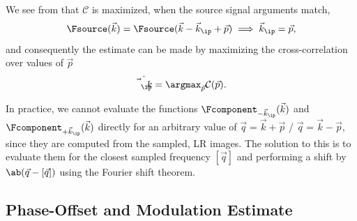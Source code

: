 We see from  that \(\mathcal{C}\) is maximized, when the source signal arguments match, 
    \begin{equation*}
        \Fsource(\vec{k}) = \Fsource(\vec{k} - \vec{k}_\ip + \vec{p}) \implies \vec{k}_\ip = \vec{p},
    \end{equation*}
    and consequently the estimate can be made by maximizing the cross-correlation over values of \(\vec{p}\)
    \begin{equation}
        \hat{\vec{k}_{\ip}} = \argmax_{\vec{p}} \mathcal{C}(\vec{p}).
    \end{equation}

In practice, we cannot evaluate the functions \(\Fcomponent_{-\vec{k}_\ip}(\vec{k})\) and 
    \(\Fcomponent_{+\vec{k}_\ip}(\vec{k})\) directly for an arbitrary value of \(\vec{q} = \vec{k} + \vec{p}\)
    / \(\vec{q} = \vec{k} - \vec{p}\), since they are computed from
    the sampled, \ac{LR} images.
The solution to this is to evaluate them for the closest sampled frequency \([\vec{q}]\) and performing a shift
    by \(\ab(\vec{q} - [\vec{q}])\) using the Fourier shift theorem.

\subsection{Phase-Offset and Modulation Estimate}

